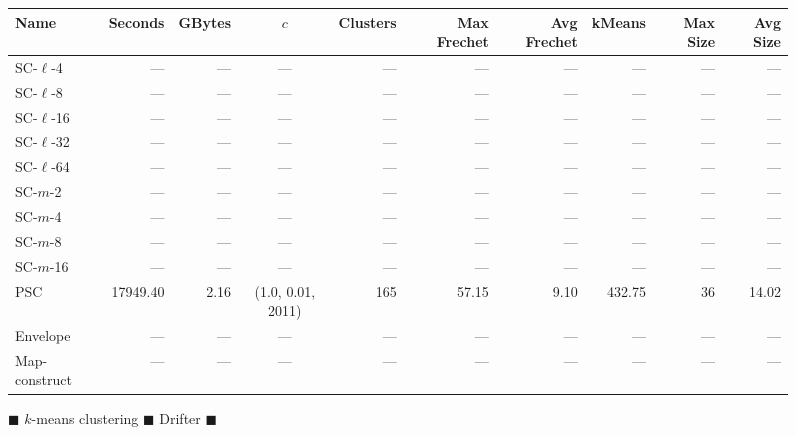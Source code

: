 
    \begin{figure} \begin{center}
        \begin{minipage}{\textwidth}
    {
    \begin{tabular}{@{}lrrcrrrrrr@{}}
        \toprule
        Name & Seconds & GBytes & $c$ & Clusters & Max Frechet & Avg Frechet & kMeans & Max Size & Avg Size\\
        \midrule
                SC-$\ell$-4 & --- & --- & --- & --- & --- & --- & --- & --- & ---\\
SC-$\ell$-8 & --- & --- & --- & --- & --- & --- & --- & --- & ---\\
SC-$\ell$-16 & --- & --- & --- & --- & --- & --- & --- & --- & ---\\
SC-$\ell$-32& --- & --- & --- & --- & --- & --- & --- & --- & ---\\
SC-$\ell$-64 & --- & --- & --- & --- & --- & --- & --- & --- & ---\\
SC-$m$-2 & --- & --- & --- & --- & --- & --- & --- & --- & ---\\
SC-$m$-4 & --- & --- & --- & --- & --- & --- & --- & --- & ---\\
SC-$m$-8 & --- & --- & --- & --- & --- & --- & --- & --- & ---\\
SC-$m$-16 & --- & --- & --- & --- & --- & --- & --- & --- & ---\\
        PSC & 17949.40 & 2.16 & (1.0, 0.01, 2011) & 165 & 57.15 & 9.10 & 432.75 & 36 & 14.02\\
        Envelope & --- & --- & --- & --- & --- & --- & --- & --- & ---\\
Map-construct & --- & --- & --- & --- & --- & --- & --- & --- & ---\\
        \bottomrule
    \end{tabular}}
\end{minipage}
        \caption{$\blacksquare$ $k$-means clustering $\blacksquare$ Drifter $\blacksquare$}

    \end{center} \end{figure}
